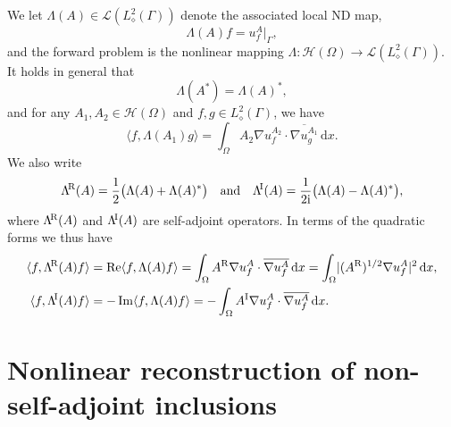 \documentclass[reqno]{amsart}
\numberwithin{equation}{section}
\numberwithin{figure}{section}
\numberwithin{table}{section}
\theoremstyle{plain}
\theoremstyle{definition}
\theoremstyle{remark}
\newcommand{\abs}[1]{\lvert#1\rvert}
\newcommand{\inner}[1]{\langle#1\rangle}
\newcommand{\redel}{\mathop{\textup{Re}}}
\newcommand{\imdel}{\mathop{\textup{Im}}}
\newcommand{\I}{\mathrm{i}}    %
\newcommand{\di}{\mathrm{d}}   %
\newcommand{\upR}{^{\textup{R}}}
\newcommand{\upI}{^{\textup{I}}}
\newcommand{\uptR}{^{\!\textup{R}}}
\newcommand{\uptI}{^{\!\textup{I}}}
\newcommand{\LambdaR}{\Lambda\uptR}
\newcommand{\LambdaI}{\Lambda\uptI}
\newcommand{\AR}{A\upR}
\newcommand{\AI}{A\upI}
\begin{document}
	We let $\Lambda(A) \in \mathscr{L}(L^2_\diamond(\Gamma))$ denote the associated local ND map,
	\begin{equation*}
		\Lambda(A)f = u_f^A|_{\Gamma},
	\end{equation*}
	and the forward problem is the nonlinear mapping $\Lambda \colon \mathcal{H}(\Omega) \to \mathscr{L}(L^2_\diamond(\Gamma))$. It holds in general that 
	\begin{equation}
		\Lambda(A^*) = \Lambda(A)^*, \label{eq:NDadjoint}
	\end{equation}
	and for any $A_1,A_2\in \mathcal{H}(\Omega)$ and $f,g\in L^2_\diamond(\Gamma)$, we have
	\begin{equation} \label{eq:lambdaweak}
		\inner{f,\Lambda(A_1)g} = \int_\Omega A_2\nabla u_f^{A_2}\cdot \overline{\nabla u_g^{A_1}}\,\di x.
	\end{equation}
	We also write
	\begin{equation*}
		\LambdaR(A) = \frac{1}{2}\bigl(\Lambda(A) + \Lambda(A)^*\bigr) \quad \text{and} \quad \LambdaI(A) = \frac{1}{2\I}\bigl(\Lambda(A) - \Lambda(A)^*\bigr),
	\end{equation*}
	where $\LambdaR(A)$ and $\LambdaI(A)$ are self-adjoint operators. In terms of the quadratic forms we thus have
	\begin{align}
		\inner{f,\LambdaR(A)f} &= \redel\inner{f,\Lambda(A)f} = \int_\Omega \AR\nabla u_f^A\cdot\overline{\nabla u_f^A} \,\di x = \int_\Omega \abs{(\AR)^{1/2}\nabla u_f^A}^2\,\di x, \label{eq:lambdaR}\\
		\inner{f,\LambdaI(A)f} &= -\imdel\inner{f,\Lambda(A)f} = -\int_\Omega \AI\nabla u_f^A\cdot\overline{\nabla u_f^A} \,\di x. \label{eq:lambdaI}
	\end{align}
	
	\section{Nonlinear reconstruction of non-self-adjoint inclusions} \label{sec:recnonlin}
	
\end{document}
